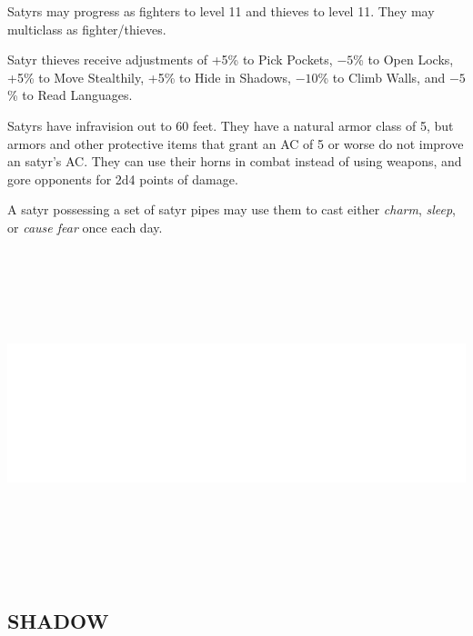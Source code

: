 \begin{multicols}{2}
\begin{minipage}{\columnwidth}
\end{minipage}

Satyrs may progress as fighters to level 11 and thieves to level 11. They may multiclass as fighter/thieves.

Satyr thieves receive adjustments of +5\% to Pick Pockets, $-5$\% to Open Locks, +5\% to Move Stealthily, +5\% to Hide in Shadows, $-10$\% to Climb Walls, and $-5$\% to Read Languages.

Satyrs have infravision out to 60 feet. They have a natural armor class of 5, but armors and other protective items that grant an AC of 5 or worse do not improve an satyr's AC. They can use their horns in combat instead of using weapons, and gore opponents for 2d4 points of damage.

A satyr possessing a set of satyr pipes may use them to cast either \textit{charm}, \textit{sleep}, or \textit{cause fear} once each day.

\noindent\includegraphics[width=\columnwidth, height=3.75in]{testblock.pdf}

\noindent
\begin{minipage}{\columnwidth}

\vspace{1em}

\subsection{SHADOW}


\end{minipage}
\end{multicols}
